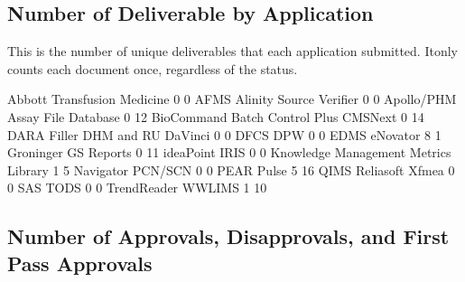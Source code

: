 \documentclass{article}
\begin{document}
\subsection{Number of Deliverable by Application}
This is the number of unique deliverables that each application submitted. Itonly counts
each document once, regardless of the status.
\begin{Schunk}
\begin{Soutput}
                                Abbott Transfusion Medicine 
                            0                             0 
                         AFMS       Alinity Source Verifier 
                            0                             0 
                   Apollo/PHM           Assay File Database 
                            0                            12 
BioCommand Batch Control Plus                       CMSNext 
                            0                            14 
       DARA Filler DHM and RU                       DaVinci 
                            0                             0 
                         DFCS                           DPW 
                            0                             0 
                         EDMS                      eNovator 
                            8                             1 
                    Groninger                    GS Reports 
                            0                            11 
                    ideaPoint                          IRIS 
                            0                             0 
         Knowledge Management               Metrics Library 
                            1                             5 
                    Navigator                       PCN/SCN 
                            0                             0 
                         PEAR                         Pulse 
                            5                            16 
                         QIMS               Reliasoft Xfmea 
                            0                             0 
                          SAS                          TODS 
                            0                             0 
                  TrendReader                        WWLIMS 
                            1                            10 
\end{Soutput}
\end{Schunk}

\subsection{Number of Approvals, Disapprovals, and First Pass Approvals}
\end{document}

